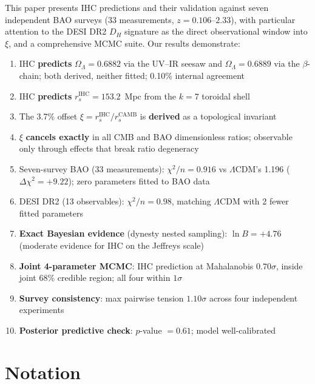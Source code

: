 \documentclass[12pt,a4paper]{article}
\begin{document}
This paper presents IHC predictions and their validation against seven independent BAO surveys (33 measurements, $z = 0.106$--$2.33$), with particular attention to the DESI DR2 $D_H$ signature as the direct observational window into $\xi$, and a comprehensive MCMC suite. Our results demonstrate:
\begin{enumerate}
  \item IHC \textbf{predicts} $\Omega_\Lambda = 0.6882$ via the UV--IR seesaw and $\Omega_\Lambda = 0.6889$ via the $\beta$-chain; both derived, neither fitted; 0.10\% internal agreement
  \item IHC \textbf{predicts} $r_s^\mathrm{IHC} = 153.2$~Mpc from the $k=7$ toroidal shell
  \item The 3.7\% offset $\xi = r_s^\mathrm{IHC}/r_s^\mathrm{CAMB}$ is \textbf{derived} as a topological invariant
  \item $\xi$ \textbf{cancels exactly} in all CMB and BAO dimensionless ratios; observable only through effects that break ratio degeneracy
  \item Seven-survey BAO (33 measurements): $\chi^2/n = 0.916$ vs $\Lambda$CDM's 1.196 ($\Delta\chi^2 = +9.22$); zero parameters fitted to BAO data
  \item DESI DR2 (13 observables): $\chi^2/n = 0.98$, matching $\Lambda$CDM with 2 fewer fitted parameters
  \item \textbf{Exact Bayesian evidence} (dynesty nested sampling): $\ln B = +4.76$ (moderate evidence for IHC on the Jeffreys scale)
  \item \textbf{Joint 4-parameter MCMC}: IHC prediction at Mahalanobis $0.70\sigma$, inside joint 68\% credible region; all four within $1\sigma$
  \item \textbf{Survey consistency}: max pairwise tension $1.10\sigma$ across four independent experiments
  \item \textbf{Posterior predictive check}: $p$-value $= 0.61$; model well-calibrated
\end{enumerate}

\section*{Notation}
\label{sec:notation}
\end{document}
